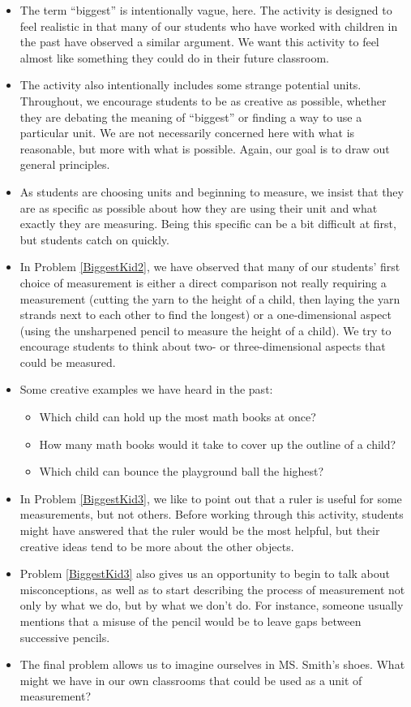 \documentclass[]{ximera}
\begin{document}
\begin{instructorNotes}
\begin{itemize}
    \item The term ``biggest'' is intentionally vague, here.  The activity is designed to feel realistic in that many of our students who have worked with children in the past have observed a similar argument.  We want this activity to feel almost like something they could do in their future classroom.
    \item The activity also intentionally includes some strange potential units.  Throughout, we encourage students to be as creative as possible, whether they are debating the meaning of ``biggest'' or finding a way to use a particular unit.  We are not necessarily concerned here with what is reasonable, but more with what is possible.  Again, our goal is to draw out general principles.
    \item As students are choosing units and beginning to measure, we insist that they are as specific as possible about how they are using their unit and what exactly they are measuring.  Being this specific can be a bit difficult at first, but students catch on quickly.
    \item In Problem \ref{BiggestKid2}, we have observed that many of our students' first choice of measurement is either a direct comparison not really requiring a measurement (cutting the yarn to the height of a child, then laying the yarn strands next to each other to find the longest) or a one-dimensional aspect (using the unsharpened pencil to measure the height of a child).  We try to encourage students to think about two- or three-dimensional aspects that could be measured.
    \item Some creative examples we have heard in the past:
        \begin{itemize}
            \item Which child can hold up the most math books at once?
            \item How many math books would it take to cover up the outline of a child?
            \item Which child can bounce the playground ball the highest?
        \end{itemize}
    \item In Problem \ref{BiggestKid3}, we like to point out that a ruler is useful for some measurements, but not others.  Before working through this activity, students might have answered that the ruler would be the most helpful, but their creative ideas tend to be more about the other objects.
    \item Problem \ref{BiggestKid3} also gives us an opportunity to begin to talk about misconceptions, as well as to start describing the process of measurement not only by what we do, but by what we don't do.  For instance, someone usually mentions that a misuse of the pencil would be to leave gaps between successive pencils.
    \item The final problem allows us to imagine ourselves in MS. Smith's shoes.  What might we have in our own classrooms that could be used as a unit of measurement?
\end{itemize}
    


\end{instructorNotes}
\end{document}
